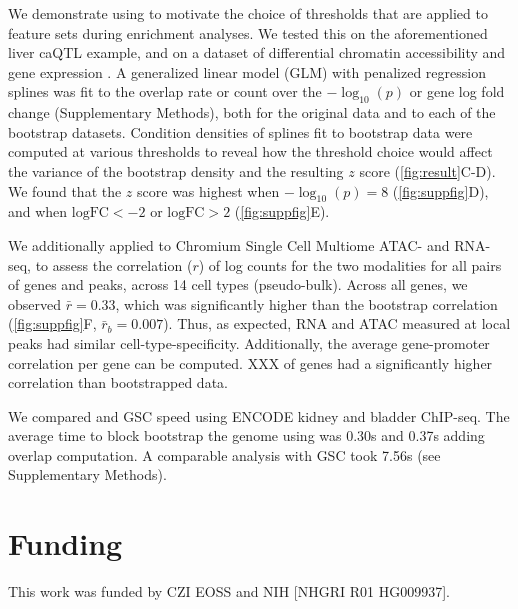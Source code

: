 We demonstrate using \bootranges to motivate the choice of thresholds 
that are applied to feature sets during enrichment analyses.
We tested this on the aforementioned liver caQTL example, and on a
dataset of differential chromatin accessibility and gene expression 
\citep{alasoo2018shared,lee2020fluent}.
A generalized linear model (GLM) with penalized regression splines was
fit to the overlap rate or count over the $-\log_{10}(p)$ or
gene log fold change (Supplementary Methods), both for the original
data and to each of the bootstrap datasets.
Condition densities of splines fit to bootstrap data
were computed at various thresholds to reveal how
the threshold choice would affect the
variance of the bootstrap density and the resulting $z$ score
(\cref{fig:result}C-D).
We found that the $z$ score was highest when $-\log_{10}(p) = 8$
(\cref{fig:suppfig}D),
and when $\textrm{logFC} < -2$ or $\textrm{logFC} > 2$
(\cref{fig:suppfig}E).

We additionally applied \bootranges to Chromium Single Cell Multiome
ATAC- and RNA-seq, to assess the correlation ($r$) of log counts for the two
modalities for all pairs of genes and peaks, across
14 cell types (pseudo-bulk). Across all genes, we observed
$\bar{r} = 0.33$, which was 
significantly higher than the bootstrap correlation
(\cref{fig:suppfig}F, $\bar{r}_{b} = 0.007$). Thus, as expected, RNA
and ATAC measured at local peaks had similar cell-type-specificity.
Additionally, the average gene-promoter
correlation per gene can be computed. XXX of genes had a
significantly higher correlation than bootstrapped data.

We compared \bootranges and GSC speed using
ENCODE kidney and bladder ChIP-seq. The average time to
block bootstrap the genome using \bootranges was 0.30s and
0.37s adding overlap computation. A comparable
analysis with GSC took 7.56s (see Supplementary Methods).

\vspace*{-25pt}

\section*{Funding}
This work was funded by CZI EOSS and NIH [NHGRI R01 HG009937]. 

\vspace*{-25pt}
